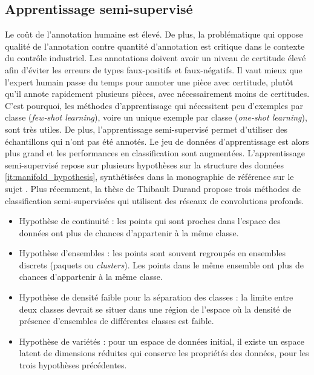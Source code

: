 \subsection{Apprentissage semi-supervisé}
Le coût de l'annotation humaine est élevé.
De plus, la problématique qui oppose qualité de l'annotation contre quantité d'annotation est critique dans le contexte du contrôle industriel.
Les annotations doivent avoir un niveau de certitude élevé afin d'éviter les erreurs de types faux-positifs et faux-négatifs.
Il vaut mieux que l'expert humain passe du temps pour annoter une pièce avec certitude, plutôt qu'il annote rapidement plusieurs pièces, avec nécessairement moins de certitudes.
C'est pourquoi, les méthodes d'apprentissage qui nécessitent peu d'exemples par classe (\textit{few-shot learning}), voire un unique exemple par classe (\textit{one-shot learning}), sont très utiles.
De plus, l'apprentissage semi-supervisé permet d'utiliser des échantillons qui n'ont pas été annotés.
Le jeu de données d'apprentissage est alors plus grand et les performances en classification sont augmentées.
L'apprentissage semi-supervisé repose sur plusieurs hypothèses sur la structure des données \ref{it:manifold_hypothesis}, synthétisées dans la monographie de référence sur le sujet \cite{chapelle_semi-supervised_2010}.
Plus récemment, la thèse de Thibault Durand \cite{durand_weakly_2017} propose trois méthodes de classification semi-supervisées qui utilisent des réseaux de convolutions profonds.

\begin{itemize} \label{it:manifold_hypothesis}
    \item Hypothèse de continuité : les points qui sont proches dans l'espace des données ont plus de chances d'appartenir à la même classe.
    \item Hypothèse d'ensembles : les points sont souvent regroupés en ensembles discrets (paquets ou \textit{clusters}). Les points dans le même ensemble ont plus de chances d'appartenir à la même classe.
    \item Hypothèse de densité faible pour la séparation des classes : la limite entre deux classes devrait se situer dans une région de l'espace où la densité de présence d'ensembles de différentes classes est faible.
    \item Hypothèse de variétés : pour un espace de données initial, il existe un espace latent de dimensions réduites qui conserve les propriétés des données, pour les trois hypothèses précédentes.
\end{itemize}

